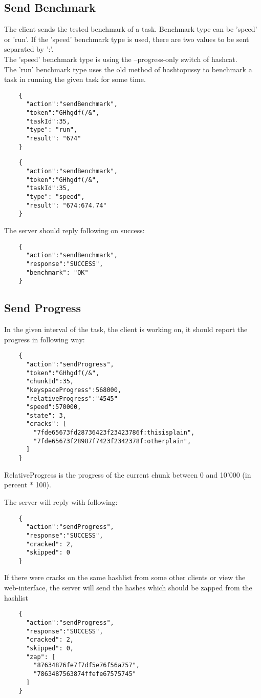 \documentclass{article}
\begin{document}
	\subsection*{Send Benchmark}
	The client sends the tested benchmark of a task. Benchmark type can be 'speed' or 'run'. If the 'speed' benchmark type is used, there are two values to be sent separated by ':'. \\
	The 'speed' benchmark type is using the --progress-only switch of hashcat. \\
	The 'run' benchmark type uses the old method of hashtopussy to benchmark a task in running the given task for some time.
	\begin{verbatim}
	{
	  "action":"sendBenchmark",
	  "token":"GHhgdf(/&",
	  "taskId":35,
	  "type": "run",
	  "result": "674"
	}
	\end{verbatim}
	\begin{verbatim}
	{
	  "action":"sendBenchmark",
	  "token":"GHhgdf(/&",
	  "taskId":35,
	  "type": "speed",
	  "result": "674:674.74"
	}
	\end{verbatim}
	The server should reply following on success:
	\begin{verbatim}
	{
	  "action":"sendBenchmark",
	  "response":"SUCCESS",
	  "benchmark": "OK"
	}
	\end{verbatim}
	
	
	\subsection*{Send Progress}
	In the given interval of the task, the client is working on, it should report the progress in following way:
	\begin{verbatim}
	{
	  "action":"sendProgress",
	  "token":"GHhgdf(/&",
	  "chunkId":35,
	  "keyspaceProgress":568000,
	  "relativeProgress":"4545"
	  "speed":570000,
	  "state": 3,
	  "cracks": [
	    "7fde65673fd28736423f23423786f:thisisplain",
	    "7fde65673f28987f7423f2342378f:otherplain",
	  ]
	}
	\end{verbatim}
	RelativeProgress is the progress of the current chunk between 0 and 10'000 (in percent * 100).
	
	The server will reply with following:
	\begin{verbatim}
	{
	  "action":"sendProgress",
	  "response":"SUCCESS",
	  "cracked": 2,
	  "skipped": 0
	}
	\end{verbatim}
	If there were cracks on the same hashlist from some other clients or view the web-interface, the server will send the hashes which should be zapped from the hashlist
	\begin{verbatim}
	{
	  "action":"sendProgress",
	  "response":"SUCCESS",
	  "cracked": 2,
	  "skipped": 0,
	  "zap": [
	    "87634876fe7f7df5e76f56a757",
	    "7863487563874ffefe67575745"
	  ]
	}
	\end{verbatim}
\end{document}
